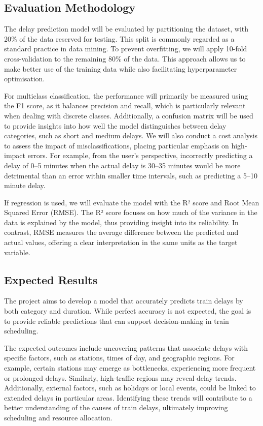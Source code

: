 \documentclass[a4paper,oneside,bibliography=totoc]{scrartcl}
\begin{document}
\subsection{Evaluation Methodology}\label{subsec:eval-methodology}
The delay prediction model will be evaluated by partitioning the dataset, with 20\% of the data reserved for testing.
This split is commonly regarded as a standard practice in data mining.
To prevent overfitting, we will apply 10-fold cross-validation to the remaining 80\% of the data.
This approach allows us to make better use of the training data while also facilitating hyperparameter optimisation.

For multiclass classification, the performance will primarily be measured using the F1 score,
as it balances precision and recall, which is particularly relevant when dealing with discrete classes.
Additionally, a confusion matrix will be used to provide insights into how well the model distinguishes between delay categories, such as short and medium delays.
We will also conduct a cost analysis to assess the impact of misclassifications, placing particular emphasis on high-impact errors.
For example, from the user's perspective,
incorrectly predicting a delay of 0–5 minutes when the actual delay is 30–35 minutes would be more detrimental than an error within smaller time intervals,
such as predicting a 5–10 minute delay.

If regression is used, we will evaluate the model with the R² score and Root Mean Squared Error (RMSE).
The R² score focuses on how much of the variance in the data is explained by the model, thus providing insight into its reliability.
In contrast, RMSE measures the average difference between the predicted and actual values,
offering a clear interpretation in the same units as the target variable.

\subsection{Expected Results}\label{subsec:expected_results}

The project aims to develop a model that accurately predicts train delays by both category and duration.
While perfect accuracy is not expected, the goal is to provide reliable predictions that can support decision-making in train scheduling.

The expected outcomes include uncovering patterns that associate delays with specific factors,
such as stations, times of day, and geographic regions.
For example, certain stations may emerge as bottlenecks, experiencing more frequent or prolonged delays.
Similarly, high-traffic regions may reveal delay trends.
Additionally, external factors, such as holidays or local events, could be linked to extended delays in particular areas.
Identifying these trends will contribute to a better understanding of the causes of train delays, ultimately improving scheduling and resource allocation.
\end{document}
